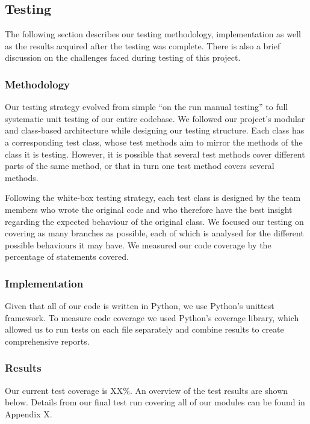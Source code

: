 \documentclass[a4paper,11pt]{article}
\begin{document}
\subsection{Testing}
The following section describes our testing methodology, implementation as well as the results acquired after the testing was complete. There is also a brief discussion on the challenges faced during testing of this project.

\subsubsection{Methodology}
Our testing strategy evolved from simple ``on the run manual testing'' to full systematic unit testing of our entire codebase. We followed our project's modular and class-based architecture while designing our testing structure. Each class has a corresponding test class, whose test methods aim to mirror the methods of the class it is testing. However, it is possible that several test methods cover different parts of the same method, or that in turn one test method covers several methods.

Following the white-box testing strategy, each test class is designed by the team members who wrote the original code and who therefore have the best insight regarding the expected behaviour of the original class. We focused our testing on covering as many branches as possible, each of which is analysed for the different possible behaviours it may have. We measured our code coverage by the percentage of statements covered.

\subsubsection{Implementation}
Given that all of our code is written in Python, we use Python's unittest framework. To measure code coverage we used Python's coverage library, which allowed us to run tests on each file separately and combine results to create comprehensive reports.

\subsubsection{Results}
Our current test coverage is XX\%. An overview of the test results are shown below. Details from our final test run covering all of our modules can be found in Appendix X.
\end{document}
